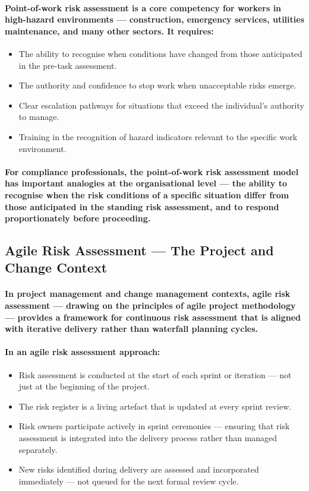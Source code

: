 \paragraph{Point-of-work risk assessment is a core competency for workers in high-hazard environments — construction, emergency services, utilities maintenance, and many other sectors. It requires:}
\begin{itemize}
  \item{The ability to recognise when conditions have changed from those anticipated in the pre-task assessment.}
  \item{The authority and confidence to stop work when unacceptable risks emerge.}
  \item{Clear escalation pathways for situations that exceed the individual's authority to manage.}
  \item{Training in the recognition of hazard indicators relevant to the specific work environment.}
\end{itemize}
\paragraph{For compliance professionals, the point-of-work risk assessment model has important analogies at the organisational level — the ability to recognise when the risk conditions of a specific situation differ from those anticipated in the standing risk assessment, and to respond proportionately before proceeding.}

\subsection{Agile Risk Assessment — The Project and Change Context}
\paragraph{In project management and change management contexts, \textbf{agile risk assessment} — drawing on the principles of agile project methodology — provides a framework for continuous risk assessment that is aligned with iterative delivery rather than waterfall planning cycles.}
\paragraph{In an agile risk assessment approach:}
\begin{itemize}
  \item{Risk assessment is conducted at the start of each sprint or iteration — not just at the beginning of the project.}
  \item{The risk register is a living artefact that is updated at every sprint review.}
  \item{Risk owners participate actively in sprint ceremonies — ensuring that risk assessment is integrated into the delivery process rather than managed separately.}
  \item{New risks identified during delivery are assessed and incorporated immediately — not queued for the next formal review cycle.}
\end{itemize}
